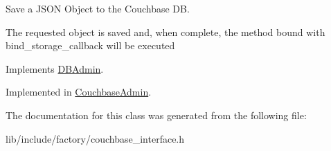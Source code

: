 Save a J\-S\-O\-N Object to the Couchbase D\-B. 

The requested object is saved and, when complete, the method bound with bind\-\_\-storage\-\_\-callback will be executed 

Implements \hyperlink{classDBAdmin_a29372700a0be4c34ef7ffb956927d9cd}{D\-B\-Admin}.



Implemented in \hyperlink{classCouchbaseAdmin_a88a4592398aba43761a3a43873f012db}{Couchbase\-Admin}.



The documentation for this class was generated from the following file\-:\begin{DoxyCompactItemize}
\item 
lib/include/factory/couchbase\-\_\-interface.\-h\end{DoxyCompactItemize}
